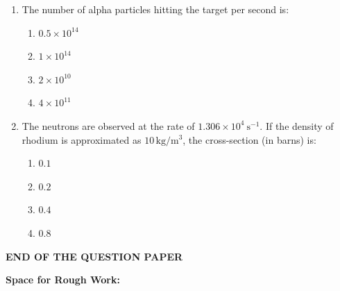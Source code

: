 \documentclass[journal,12pt,onecolumn]{IEEEtran}
\begin{document}
\begin{enumerate}[itemsep = 1em]
\item The number of alpha particles hitting the target per second is:

\hfill{}

\begin{multicols}{2}
\begin{enumerate}
    \item $0.5 \times 10^{14}$
    \item $1 \times 10^{14}$
    \item $2 \times 10^{10}$
    \item $4 \times 10^{11}$
\end{enumerate}
\end{multicols}

\item The neutrons are observed at the rate of $1.306 \times 10^4 \ \mathrm{s^{-1}}$. If the density of rhodium is approximated as $10\,\mathrm{kg/m^3}$, the cross-section (in barns) is:

\hfill{}

\begin{multicols}{2}
\begin{enumerate}
    \item $0.1$
    \item $0.2$
    \item $0.4$
    \item $0.8$
\end{enumerate}
\end{multicols}

\end{enumerate}


\begin{center}
 \textbf{END OF THE QUESTION PAPER}   
\end{center}


\vspace{2cm}
\textbf{Space for Rough Work:} \\
\end{document}
